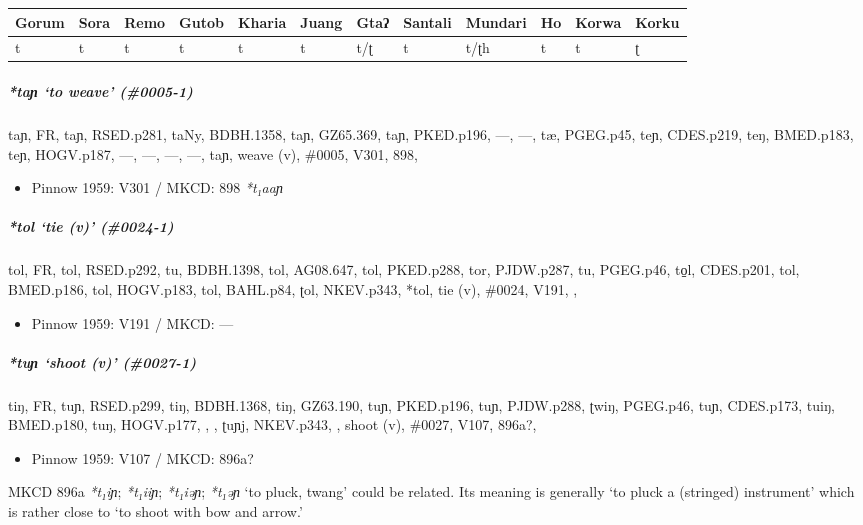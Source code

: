\documentclass[a4paper,]{article}
\providecommand{\tightlist}{%
  \setlength{\itemsep}{0pt}\setlength{\parskip}{0pt}}
\let\oldsubparagraph\subparagraph
\renewcommand{\subparagraph}[1]{\oldsubparagraph{#1}\mbox{}}
\begin{document}
\begin{longtable}[]{@{}llllllllllll@{}}
\toprule
Gorum & Sora & Remo & Gutob & Kharia & Juang & Gtaʔ & Santali & Mundari
& Ho & Korwa & Korku\tabularnewline
\midrule
\endhead
t & t & t & t & t & t & t/ʈ & t & t/ʈh & t & t & ʈ\tabularnewline
\bottomrule
\end{longtable}

\subparagraph{\texorpdfstring{\emph{*taɲ} `to weave'
(\#0005-1)}{*taɲ to weave (\#0005-1)}}\label{taux272-to-weave-0005-1}

taɲ, FR, taɲ, RSED.p281, taNy, BDBH.1358, taɲ, GZ65.369, taɲ, PKED.p196,
---, ---, tæ, PGEG.p45, teɲ, CDES.p219, teŋ, BMED.p183, teɲ, HOGV.p187,
---, ---, ---, ---, taɲ, weave (v), \#0005, V301, 898,

\begin{itemize}
\tightlist
\item
  Pinnow 1959: V301 / MKCD: 898 \emph{*t₁aaɲ}
\end{itemize}

\subparagraph{\texorpdfstring{\emph{*tol} `tie (v)'
(\#0024-1)}{*tol tie (v) (\#0024-1)}}\label{tol-tie-v-0024-1}

tol, FR, tol, RSED.p292, tu, BDBH.1398, tol, AG08.647, tol, PKED.p288,
tor, PJDW.p287, tu, PGEG.p46, to̠l, CDES.p201, tol, BMED.p186, tol,
HOGV.p183, tol, BAHL.p84, ʈol, NKEV.p343, *tol, tie (v), \#0024, V191, ,

\begin{itemize}
\tightlist
\item
  Pinnow 1959: V191 / MKCD: ---
\end{itemize}

\subparagraph{\texorpdfstring{\emph{*tuɲ} `shoot (v)'
(\#0027-1)}{*tuɲ shoot (v) (\#0027-1)}}\label{tuux272-shoot-v-0027-1}

tiŋ, FR, tuɲ, RSED.p299, tiŋ, BDBH.1368, tiŋ, GZ63.190, tuɲ, PKED.p196,
tuɲ, PJDW.p288, ʈwiŋ, PGEG.p46, tuɲ, CDES.p173, tuiŋ, BMED.p180, tuŋ,
HOGV.p177, , , ʈuɲj, NKEV.p343, , shoot (v), \#0027, V107, 896a?,

\begin{itemize}
\tightlist
\item
  Pinnow 1959: V107 / MKCD: 896a?
\end{itemize}

MKCD 896a \emph{*t₁iɲ}; \emph{*t₁iiɲ}; \emph{*t₁iəɲ}; \emph{*t₁əɲ} `to
pluck, twang' could be related. Its meaning is generally `to pluck a
(stringed) instrument' which is rather close to `to shoot with bow and
arrow.'
\end{document}
